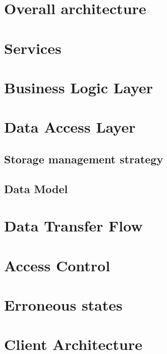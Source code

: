 \documentclass{report}
\begin{document}
\section{Overall architecture}


\section{Services}


\section{Business Logic Layer}


\section{Data Access Layer}
\subsection{Storage management strategy}

\subsection{Data Model}



\newpage
\section{Data Transfer Flow}


% 

\section{Access Control}


\section{Erroneous states}




\section{Client Architecture}

\end{document}
